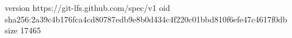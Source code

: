 version https://git-lfs.github.com/spec/v1
oid sha256:2a39c4b176fca4cd80787edb9e8b0d434c4f220c01bbd810f6efe47c4617f0db
size 17465
